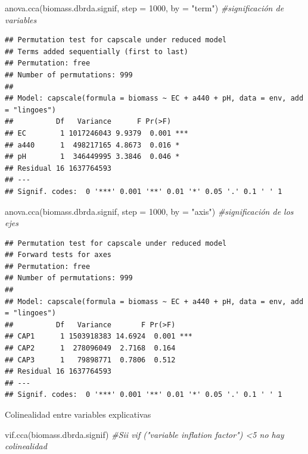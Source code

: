 \documentclass[
]{book}
\newenvironment{Shaded}{\begin{snugshade}}{\end{snugshade}}
\newcommand{\AttributeTok}[1]{\textcolor[rgb]{0.77,0.63,0.00}{#1}}
\newcommand{\CommentTok}[1]{\textcolor[rgb]{0.56,0.35,0.01}{\textit{#1}}}
\newcommand{\DecValTok}[1]{\textcolor[rgb]{0.00,0.00,0.81}{#1}}
\newcommand{\FunctionTok}[1]{\textcolor[rgb]{0.00,0.00,0.00}{#1}}
\newcommand{\NormalTok}[1]{#1}
\newcommand{\StringTok}[1]{\textcolor[rgb]{0.31,0.60,0.02}{#1}}
\begin{document}
\begin{Shaded}
\begin{Highlighting}[]
\FunctionTok{anova.cca}\NormalTok{(biomass.dbrda.signif, }\AttributeTok{step =} \DecValTok{1000}\NormalTok{, }\AttributeTok{by =} \StringTok{"term"}\NormalTok{) }\CommentTok{\#significación de variables }
\end{Highlighting}
\end{Shaded}

\begin{verbatim}
## Permutation test for capscale under reduced model
## Terms added sequentially (first to last)
## Permutation: free
## Number of permutations: 999
## 
## Model: capscale(formula = biomass ~ EC + a440 + pH, data = env, add = "lingoes")
##          Df   Variance      F Pr(>F)    
## EC        1 1017246043 9.9379  0.001 ***
## a440      1  498217165 4.8673  0.016 *  
## pH        1  346449995 3.3846  0.046 *  
## Residual 16 1637764593                  
## ---
## Signif. codes:  0 '***' 0.001 '**' 0.01 '*' 0.05 '.' 0.1 ' ' 1
\end{verbatim}

\begin{Shaded}
\begin{Highlighting}[]
\FunctionTok{anova.cca}\NormalTok{(biomass.dbrda.signif, }\AttributeTok{step =} \DecValTok{1000}\NormalTok{, }\AttributeTok{by =} \StringTok{"axis"}\NormalTok{) }\CommentTok{\#significación de los ejes}
\end{Highlighting}
\end{Shaded}

\begin{verbatim}
## Permutation test for capscale under reduced model
## Forward tests for axes
## Permutation: free
## Number of permutations: 999
## 
## Model: capscale(formula = biomass ~ EC + a440 + pH, data = env, add = "lingoes")
##          Df   Variance       F Pr(>F)    
## CAP1      1 1503918383 14.6924  0.001 ***
## CAP2      1  278096049  2.7168  0.164    
## CAP3      1   79898771  0.7806  0.512    
## Residual 16 1637764593                   
## ---
## Signif. codes:  0 '***' 0.001 '**' 0.01 '*' 0.05 '.' 0.1 ' ' 1
\end{verbatim}

Colinealidad entre variables explicativas

\begin{Shaded}
\begin{Highlighting}[]
\FunctionTok{vif.cca}\NormalTok{(biomass.dbrda.signif) }\CommentTok{\#Sii vif ("variable inflation factor") \textless{}5 no hay colinealidad}
\end{Highlighting}
\end{Shaded}
\end{document}
